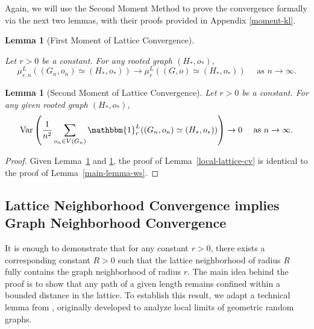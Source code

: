 \documentclass[10pt]{amsart}
\newtheorem{lemma}[theorem]{Lemma}
\begin{document}
Again, we will use the Second Moment Method to prove the convergence formally via the next two lemmas, with their proofs provided in Appendix \ref{moment-kl}. 

\begin{lemma}[First Moment of Lattice Convergence] \label{lattice-cv-1} 

Let \(r > 0\) be a constant. For any  rooted graph $(H_*,o_*)$,
\begin{equation*} 
\mu_{r, n}^L((G_n,o_n) \simeq (H_*,o_*)) \to \mu_{r}^L((G,o) \simeq (H_*,o_*)) \quad \text{ as $n \to \infty.$}
\end{equation*}
\end{lemma}

\begin{lemma}[Second Moment of Lattice Convergence] \label{lattice-cv-2} Let \(r > 0\) be a constant.  For any given rooted graph $(H_*,o_*)$,
\begin{equation*} 
\text{Var}\left(\frac{1}{n^2}\sum_{o_n\in V(G_n)}  \mathbbm{1}_r^L((G_n,o_n)\simeq (H_*,o_*)) \right) \to 0 \quad \text{ as $n \to \infty.$}
\end{equation*}
\end{lemma}

\begin{proof}
    Given Lemma~\ref{lattice-cv-1} and \ref{lattice-cv-2}, the proof of  Lemma~\ref{local-lattice-cv} is identical to the proof of Lemma~\ref{main-lemma-ws}. 
\end{proof}

\subsection{Lattice Neighborhood Convergence implies Graph Neighborhood Convergence}\label{sec: lattic-to-graph}
It is enough to demonstrate that for any constant \(r > 0\), there exists a corresponding constant \(R > 0\) such that the lattice neighborhood of radius \(R\) fully contains the graph neighborhood of radius \(r\). The main idea behind the proof is to show that any path of a given length remains confined within a bounded distance in the lattice. To establish this result, we adapt a technical lemma from \cite{van2021local}, originally developed to analyze local limits of geometric random graphs. 
\end{document}
